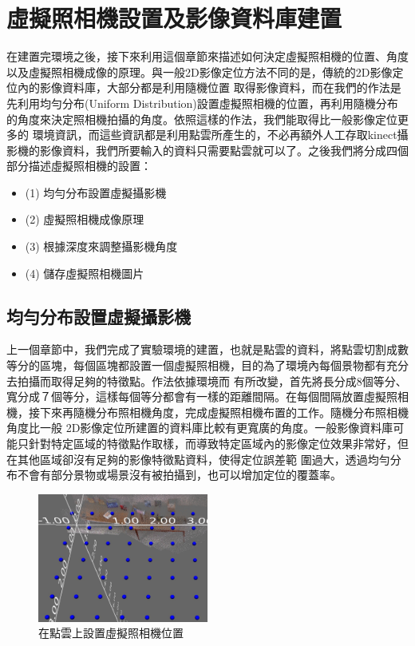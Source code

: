 \section{虛擬照相機設置及影像資料庫建置}
	
	在建置完環境之後，接下來利用這個章節來描述如何決定虛擬照相機的位置、角度以及虛擬照相機成像的原理。與一般2D影像定位方法不同的是，傳統的2D影像定位內的影像資料庫，大部分都是利用隨機位置
	取得影像資料，而在我們的作法是先利用均勻分布(Uniform Distribution)設置虛擬照相機的位置，再利用隨機分布的角度來決定照相機拍攝的角度。依照這樣的作法，我們能取得比一般影像定位更多的
	環境資訊，而這些資訊都是利用點雲所產生的，不必再額外人工存取kinect攝影機的影像資料，我們所要輸入的資料只需要點雲就可以了。之後我們將分成四個部分描述虛擬照相機的設置：
	
	\begin{itemize}
		\item (1) 均勻分布設置虛擬攝影機
    	\item (2) 虛擬照相機成像原理
    	\item (3) 根據深度來調整攝影機角度
    	\item (4) 儲存虛擬照相機圖片
	\end{itemize}  		

\subsection{均勻分布設置虛擬攝影機}
%
	上一個章節中，我們完成了實驗環境的建置，也就是點雲的資料，將點雲切割成數等分的區塊，每個區塊都設置一個虛擬照相機，目的為了環境內每個景物都有充分去拍攝而取得足夠的特徵點。作法依據環境而
	有所改變，首先將長分成8個等分、寬分成７個等分，這樣每個等分都會有一樣的距離間隔。在每個間隔放置虛擬照相機，接下來再隨機分布照相機角度，完成虛擬照相機布置的工作。隨機分布照相機角度比一般
	2D影像定位所建置的資料庫比較有更寬廣的角度。一般影像資料庫可能只針對特定區域的特徵點作取樣，而導致特定區域內的影像定位效果非常好，但在其他區域卻沒有足夠的影像特徵點資料，使得定位誤差範
	圍過大，透過均勻分布不會有部分景物或場景沒有被拍攝到，也可以增加定位的覆蓋率。
	
	\begin{figure}
	\begin{center}
	  \includegraphics[width=0.5\textwidth]{figures/VirtualCameraPose.jpg}
	  \caption{在點雲上設置虛擬照相機位置}
	  \label{fig:Virtual Camera Pose}
	\end{center}
	\end{figure}
	


